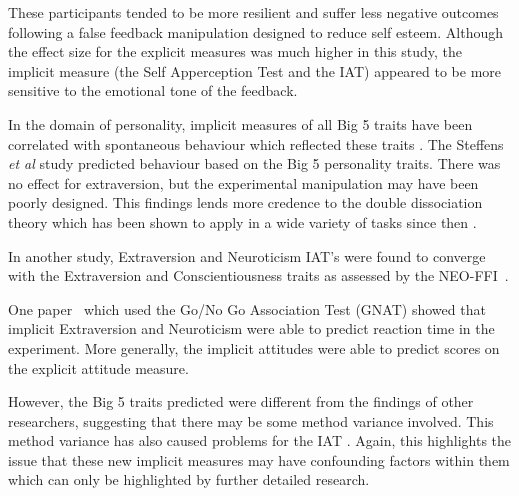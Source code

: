 These participants tended to be more resilient and suffer less negative outcomes following a false feedback manipulation designed to reduce self esteem. Although the effect size for the explicit measures was much higher in this study, the implicit measure (the Self Apperception Test and the IAT) appeared to be more sensitive to the emotional tone of the feedback. 


In the domain of personality, implicit measures of all Big 5 traits have been correlated with spontaneous behaviour which reflected these traits \cite{Steffens2006}. 
The Steffens \textit{et al} study predicted behaviour based on the Big 5 personality traits. There was no effect for extraversion, but the experimental manipulation may have been poorly designed. This findings lends more credence to the double dissociation theory \cite{Asendorpf2002} which has been shown to apply in a wide variety of tasks since then \cite{Perugini2005,Conner2005}. 

In another study, Extraversion and Neuroticism IAT's were found to converge with the Extraversion and Conscientiousness traits as assessed by the NEO-FFI~\cite{Grumm2007}.%


One paper~\cite{Boldero2007} which used the Go/No Go Association Test (GNAT) showed that implicit Extraversion and Neuroticism were able to predict reaction time in the experiment. More generally, the implicit attitudes were able to predict scores on the explicit attitude measure. 

However, the Big 5 traits predicted were different from the findings of other researchers, suggesting that there may be some method variance involved. This method variance has also caused problems for the IAT \cite{Mierke2003,Greenwald2003a}. Again, this highlights the issue that these new implicit measures may have confounding factors within them which can only be highlighted by further detailed research.

